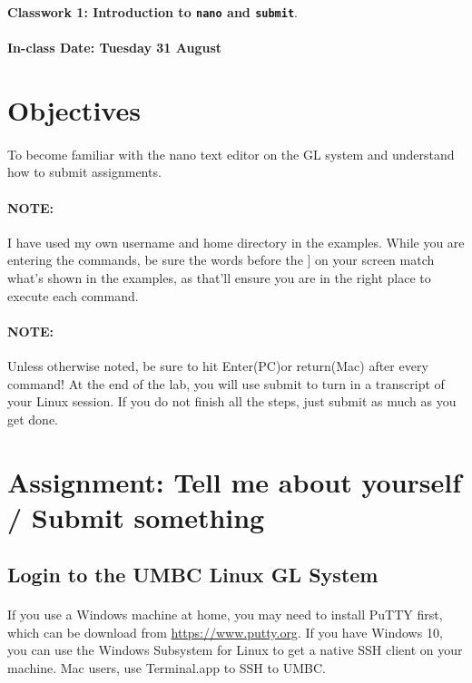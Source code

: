 \documentclass[letter,11pt]{article}
\begin{document}
\huge
\textbf{Classwork 1: Introduction to \texttt{nano} and \texttt{submit}}.
\normalsize
\\ ~~ \\
\textbf{In-class Date: Tuesday 31 August}

\section*{Objectives}
\paragraph{}To become familiar with the nano text editor on the GL system and understand how to submit assignments.

\paragraph{NOTE:} I have used my own username and home directory in the examples. While you are entering the commands, be sure the words before the ] on your screen match what’s shown in the examples, as that’ll ensure you are in the right place to execute each command.

\paragraph{NOTE:} Unless otherwise noted, be sure to hit Enter(PC)or return(Mac) after every command! At the end of the lab, you will use submit to turn in a transcript of your Linux session. If you do not finish all the steps, just submit as much as you get done.

\section*{Assignment: Tell me about yourself / Submit something}
\subsection{Login to the UMBC Linux GL System}
\paragraph{}If you use a Windows machine at home, you may need to install PuTTY first, which can be download from \url{https://www.putty.org}. If you have Windows 10, you can use the Windows Subsystem for Linux to get a native SSH client on your machine. Mac users, use Terminal.app to SSH to UMBC.
\end{document}
